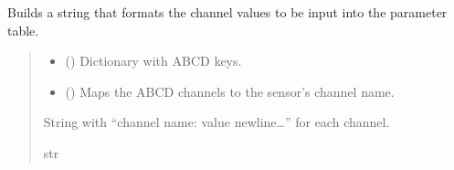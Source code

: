 \documentclass[letterpaper,10pt,english]{sphinxmanual}
\begin{document}
\begin{fulllineitems}
\begin{fulllineitems}
\label{\detokenize{Setup_8401HR:Setup_8401HR.Setup_8401HR._NiceABCDtableText}}
\pysigstartsignatures
{}
\pysigstopsignatures
\sphinxAtStartPar
Builds a string that formats the channel values to be input into the parameter table.
\begin{quote}\begin{description}
\begin{itemize}
\item {} 
\sphinxAtStartPar
{} (\sphinxstyleliteralemphasis{\sphinxupquote{{[}}}\sphinxstyleliteralemphasis{\sphinxupquote{,}}\sphinxstyleliteralemphasis{\sphinxupquote{ | }}\sphinxstyleliteralemphasis{\sphinxupquote{ | }}\sphinxstyleliteralemphasis{\sphinxupquote{{]}}}) \textendash{} Dictionary with ABCD keys.

\item {} 
\sphinxAtStartPar
{} (\sphinxstyleliteralemphasis{\sphinxupquote{{[}}}\sphinxstyleliteralemphasis{\sphinxupquote{,}}\sphinxstyleliteralemphasis{\sphinxupquote{{]}}}) \textendash{} Maps the ABCD channels to the sensor’s channel name.

\end{itemize}

\sphinxAtStartPar
String with “channel name: value newline…” for each channel.

\sphinxAtStartPar
str

\end{description}\end{quote}


\end{fulllineitems}
\end{fulllineitems}
\end{document}
